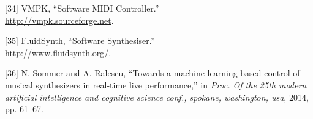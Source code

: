 \documentclass[12pt,]{article}
\begin{document}
\leavevmode\hypertarget{ref-vmpk}{}%
{[}34{]} \relax VMPK, ``Software MIDI Controller.'' \\
\url{http://vmpk.sourceforge.net}.

\leavevmode\hypertarget{ref-fluidsynth}{}%
{[}35{]} \relax FluidSynth, ``Software Synthesiser.'' \\
\url{http://www.fluidsynth.org/}.

\leavevmode\hypertarget{ref-sommer2014towards}{}%
{[}36{]} N. Sommer and A. Ralescu, ``Towards a machine learning based
control of musical synthesizers in real-time live performance,'' in
\emph{Proc. Of the 25th modern artificial intelligence and cognitive
science conf., spokane, washington, usa}, 2014, pp. 61--67.
\end{document}
